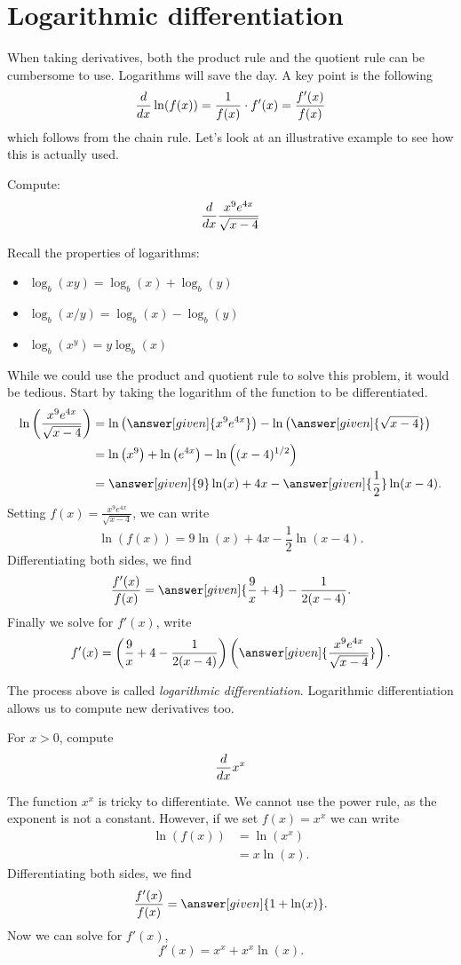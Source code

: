 \documentclass{ximera}
\begin{document}
\section{Logarithmic differentiation}


When taking derivatives, both the product rule and the quotient rule
can be cumbersome to use. Logarithms will save the day. A key point is
the following
\[
\frac{d}{\mathop{}\!d x} \ln(f(x)) = \frac{1}{f(x)}\cdot f'(x) = \frac{f'(x)}{f(x)}
\]
which follows from the chain rule. Let's look at an illustrative
example to see how this is actually used.

\begin{example} 
Compute:
\[
\frac{d}{\mathop{}\!d x} \frac{x^9e^{4x}}{\sqrt{x-4}}
\]
\begin{explanation}
Recall the properties of logarithms:
\begin{itemize}
\item $\log_b(xy) = \log_b(x) + \log_b(y)$
\item $\log_b(x/y) = \log_b(x) - \log_b(y)$
\item $\log_b(x^y) = y\log_b(x)$
\end{itemize}

While we could use the product and quotient rule to solve this
problem, it would be tedious. Start by taking the logarithm of the
function to be differentiated.
\begin{align*}
\ln\left(\frac{x^9e^{4x}}{\sqrt{x-4}} \right) &= \ln\left(\answer[given]{x^9e^{4x}}\right) - \ln\left(\answer[given]{\sqrt{x-4}}\right)\\
&= \ln\left(x^9\right)+\ln\left(e^{4x}\right) - \ln\left((x-4)^{1/2}\right)\\
&= \answer[given]{9}\ln(x)+4x - \answer[given]{\frac{1}{2}}\ln(x-4).
\end{align*}
Setting $f(x) = \frac{x^9e^{4x}}{\sqrt{x-4}}$, we can write
\[
\ln(f(x)) = 9\ln(x)+4x - \frac{1}{2}\ln(x-4).
\]
Differentiating both sides, we find
\[
\frac{f'(x)}{f(x)} = \answer[given]{\frac{9}{x}+4} - \frac{1}{2(x-4)}.
\]
Finally we solve for $f'(x)$, write
\[
f'(x) = \left(\frac{9}{x}+4 - \frac{1}{2(x-4)}\right)\left(\answer[given]{\frac{x^9e^{4x}}{\sqrt{x-4}}}\right).
\]
\end{explanation}
\end{example}

The process above is called \textit{logarithmic
  differentiation}. Logarithmic differentiation allows us to compute
new derivatives too.

\begin{example}
For  $x>0$, compute 
\[
\frac{d}{\mathop{}\!d x} x^x
\]
\begin{explanation}
The function $x^x$ is tricky to differentiate. We cannot use the power
rule, as the exponent is not a constant. However, if we set $f(x) =
x^x$ we can write
\begin{align*}
\ln(f(x)) &= \ln\left(x^x\right)\\
&=x\ln(x).
\end{align*}
Differentiating both sides, we find
\[
\frac{f'(x)}{f(x)} = \answer[given]{1 + \ln(x)}.
\]
Now we can solve for $f'(x)$, 
\[
f'(x) = x^x + x^x\ln(x).
\]
\end{explanation}
\end{example}
\end{document}
